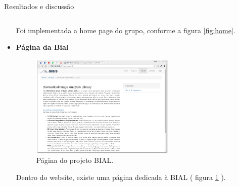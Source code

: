 \documentclass[final]{beamer} %
\begin{document}
\begin{frame}[t]
\begin{columns}[t]
\begin{column}{0.60\paperwidth}
\begin{block}{Resultados e discussão}
\begin{columns}[t,totalwidth=0.60\paperwidth]
\begin{column}{0.28\paperwidth}
\begin{itemize}
					Foi implementada a home page do grupo, conforme a figura \ref{fig:home}.
					\item {\bf Página da Bial}\\
					\begin{figure}[ht]
						\begin{center}
							\includegraphics[width=0.65\textwidth]{./figures/project}
							\caption{Página do projeto BIAL. \label{fig:projeto}}
						\end{center}
					\end{figure}
					Dentro do website, existe uma página dedicada à BIAL ( figura \ref{fig:projeto} ).
					

\end{itemize}
\end{column}
\end{columns}
\end{block}
\end{column}
\end{columns}
\end{frame}
\end{document}
